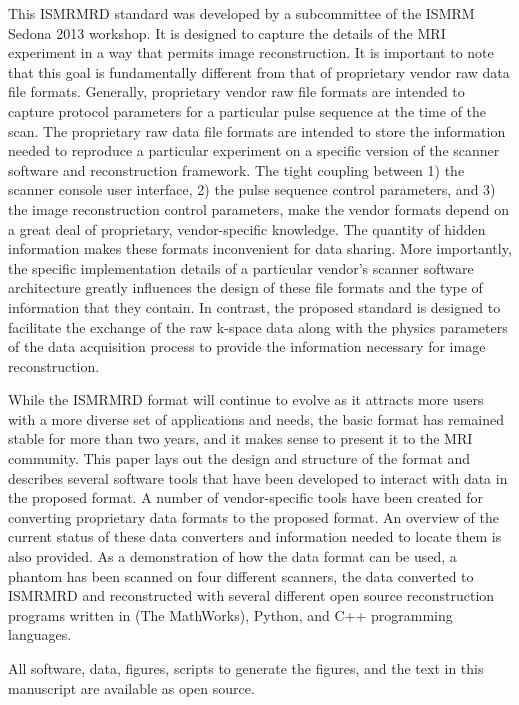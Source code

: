 \documentclass[12pt, draft]{article}
\newcommand{\mreplaced}[2][None]{\replaced[remark=#1]{#2}}
\begin{document}
This ISMRMRD standard was developed by a subcommittee of the ISMRM Sedona 2013 workshop.  It is designed to capture the details of the MRI experiment in a way that permits image reconstruction.  It is important to note that this goal is fundamentally different from that of proprietary vendor raw data file formats.  Generally, proprietary vendor raw file formats are intended to capture protocol parameters for a particular pulse sequence at the time of the scan.  The proprietary raw data file formats are intended to store the information needed to reproduce a particular experiment on a specific version of the scanner software and reconstruction framework.  The tight coupling between 1) the scanner console user interface, 2) the pulse sequence control parameters, and 3) the image reconstruction control parameters, make the vendor formats depend on a great deal of proprietary, vendor-specific knowledge. The quantity of hidden information makes these formats inconvenient for data sharing.  More importantly, the specific implementation details of a particular vendor's scanner software architecture greatly influences the design of these file formats and the type of information that they contain.  In contrast, the proposed standard is designed to facilitate the exchange of the raw k-space data along with the physics parameters of the data acquisition process to provide the information necessary for image reconstruction.   

While the ISMRMRD format will continue to evolve as it attracts more users with a more diverse set of applications and needs, the basic format has remained stable for more than two years, and it makes sense to present it to the MRI community. This paper lays out the design and structure of the format and describes several software tools that have been developed to interact with data in the proposed format. A number of vendor-specific tools have been created for converting proprietary data formats to the proposed format. An overview of the current status of these data converters and information needed to locate them is also provided. As a demonstration of how the data format can be used, a phantom has been scanned on four different scanners, the data converted to ISMRMRD and reconstructed with several different open source reconstruction programs written in  \mreplaced[R2.14]{MATLAB}{Matlab} (The MathWorks), Python, and C++ programming languages. 

All software, data, figures, scripts to generate the figures, and the text in this manuscript are available as open source. 
\end{document}
